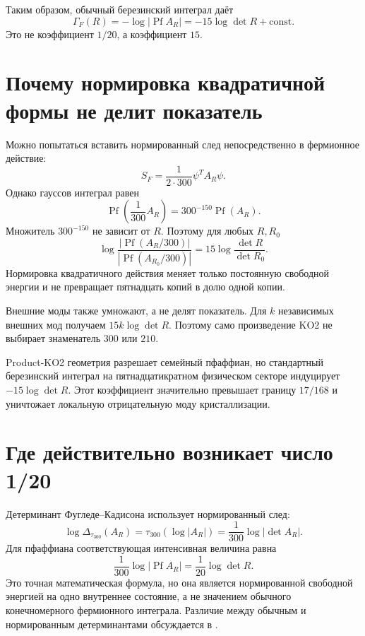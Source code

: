 Таким образом, обычный березинский интеграл даёт
\begin{equation}
 \Gamma_F(R)=-\log|\operatorname{Pf}A_R|
 =-15\log\det R+\text{const}.
 \label{eq:v6-ordinary-pfaffian-barrier}
\end{equation}
Это не коэффициент $1/20$, а коэффициент $15$.

\section{Почему нормировка квадратичной формы не делит показатель}

Можно попытаться вставить нормированный след непосредственно в
фермионное действие:
\begin{equation}
 S_F=\frac1{2\cdot300}\psi^TA_R\psi.
\end{equation}
Однако гауссов интеграл равен
\begin{equation}
 \operatorname{Pf}\!\left(\frac1{300}A_R\right)
 =300^{-150}\operatorname{Pf}(A_R).
\end{equation}
Множитель $300^{-150}$ не зависит от $R$. Поэтому для любых $R,R_0$
\begin{equation}
 \log\frac{|\operatorname{Pf}(A_R/300)|}
 {|\operatorname{Pf}(A_{R_0}/300)|}
 =15\log\frac{\det R}{\det R_0}.
 \label{eq:v6-pfaffian-scale-cancels}
\end{equation}
Нормировка квадратичного действия меняет только постоянную свободной
энергии и не превращает пятнадцать копий в долю одной копии.

Внешние моды также умножают, а не делят показатель. Для $k$ независимых
внешних мод получаем $15k\log\det R$. Поэтому само произведение KO2 не
выбирает знаменатель $300$ или $210$.

\begin{theorem}
Product-KO2 геометрия разрешает семейный пфаффиан, но стандартный
березинский интеграл на пятнадцатикратном физическом секторе индуцирует
$-15\log\det R$. Этот коэффициент значительно превышает границу
$17/168$ и уничтожает локальную отрицательную моду кристаллизации.
\end{theorem}

\section{Где действительно возникает число 1/20}

Детерминант Фугледе--Кадисона использует нормированный след:
\begin{equation}
 \log\Delta_{\tau_{300}}(A_R)
 =\tau_{300}(\log|A_R|)
 =\frac1{300}\log|\det A_R|.
\end{equation}
Для пфаффиана соответствующая интенсивная величина равна
\begin{equation}
 \frac1{300}\log|\operatorname{Pf}A_R|
 =\frac1{20}\log\det R.
 \label{eq:v6-fk-intensive-one-twentieth}
\end{equation}
Это точная математическая формула, но она является нормированной
свободной энергией на одно внутреннее состояние, а не значением обычного
конечномерного фермионного интеграла. Различие между обычным и
нормированным детерминантами обсуждается в
.

